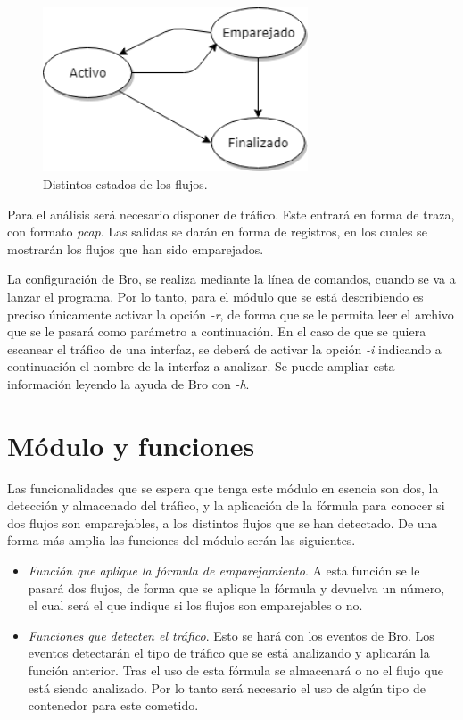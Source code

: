 \begin{figure}[H]
  \includegraphics[width=0.7\textwidth]{imagenes/flujos.png}
  \centering
  \caption{Distintos estados de los flujos.}\label{fig.flujos}
\end{figure}

\intro Para el análisis será necesario disponer de tráfico. Este entrará en forma de traza, con formato \textit{pcap}. Las salidas 
se darán en forma de registros, en los cuales se mostrarán los flujos que han sido emparejados.

\intro La configuración de Bro, se realiza mediante la línea de comandos, cuando se va a lanzar el programa. Por lo tanto, para el 
módulo que se está describiendo es preciso únicamente activar la opción \textit{-r}, de forma que se le permita leer el archivo que se 
le pasará como parámetro a continuación. En el caso de que se quiera escanear el tráfico de una interfaz, se deberá de activar la 
opción \textit{-i} indicando a continuación el nombre de la interfaz a analizar. Se puede ampliar esta información leyendo la ayuda de 
Bro con \textit{-h}.

\section{Módulo y funciones}

Las funcionalidades que se espera que tenga este módulo en esencia son dos, la detección y almacenado 
del tráfico, y la aplicación de la fórmula para conocer si dos flujos son emparejables, a los distintos flujos que 
se han detectado. De una forma más amplia las funciones del módulo serán las siguientes. 

\begin{itemize}
\item \textit{Función que aplique la fórmula de emparejamiento}. 
\intro A esta función se le pasará dos flujos, de forma que se aplique la fórmula y devuelva un número, el cual 
será el que indique si los flujos son emparejables o no.
\item \textit{Funciones que detecten el tráfico}. 
\intro Esto se hará con los eventos de Bro. Los eventos detectarán el tipo de tráfico que se está analizando 
y aplicarán la función anterior.
\intro Tras el uso de esta fórmula se almacenará o no el flujo que está siendo analizado. Por lo tanto 
será necesario el uso de algún tipo de contenedor para este cometido.
\end{itemize}

